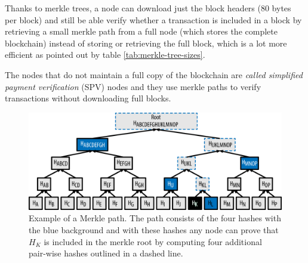  Thanks to merkle trees, a node can download just the block headers (80 bytes
 per block) and still be able verify whether a transaction is included in a
 block by retrieving a small merkle path from a full node (which stores the
 complete blockchain) instead of storing or retrieving the full block, which
 is a lot more efficient as pointed out by table \ref{tab:merkle-tree-sizes}.

 The nodes that do not maintain a full copy of the blockchain are \emph{called
 simplified payment verification} (SPV) nodes and they use merkle paths to
 verify transactions without downloading full blocks.

 \begin{table}[h!]
 \footnotesize

 \centering
 \caption{Merkle tree efficiency}
 \label{tab:merkle-tree-sizes}
 \end{table}


\begin{figure}[!htb]
	\centering
	\includegraphics[width=1\linewidth]{img/merkle-tree-path.png}
	\caption{Example of a Merkle path. The path consists of the four hashes with the
  blue background and with these hashes any node can prove that $H_K$ is included
  in the merkle root by computing four additional pair-wise hashes outlined in a
  dashed line.  }
	\label{fig:merkle-tree-path}
\end{figure}








